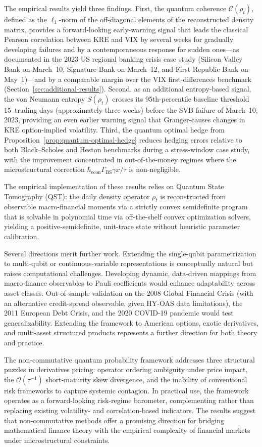 The empirical results yield three findings. First, the quantum coherence
$\mathcal{C}(\rho_t)$, defined as the $\ell_1$-norm of the off-diagonal
elements of the reconstructed density matrix, provides a forward-looking
early-warning signal that leads the classical Pearson correlation between
KRE and VIX by several weeks for gradually developing failures and by a
contemporaneous response for sudden ones---as documented in the 2023 US
regional banking crisis case study (Silicon Valley Bank on March~10,
Signature Bank on March~12, and First Republic Bank on May~1)---and by a
comparable margin over the VIX first-differences benchmark
(Section~\ref{sec:additional-results}). Second, as an additional
entropy-based signal, the von Neumann entropy
$S(\rho_t)$ crosses its 95th-percentile baseline threshold 15~trading days
(approximately three weeks) before the SVB failure of March~10, 2023,
providing an even earlier warning signal that Granger-causes changes in
KRE option-implied volatility. Third, the quantum optimal hedge from
Proposition~\ref{prop:quantum-optimal-hedge} reduces hedging errors relative
to both Black--Scholes and Heston benchmarks during a stress-window case study, with the
improvement concentrated in out-of-the-money regimes where the microstructural
correction $\hbar_{\mathrm{econ}} \Gamma_{\text{BS}} \gamma x / \tau$ is
non-negligible.

The empirical implementation of these results relies on Quantum State
Tomography (QST): the daily density operator $\rho_t$ is reconstructed
from observable macro-financial moments via a strictly convex semidefinite
program that is solvable in polynomial time via off-the-shelf convex
optimization solvers, yielding a positive-semidefinite, unit-trace state
without heuristic parameter calibration.

Several directions merit further work. Extending the single-qubit
parametrization to multi-qubit or continuous-variable representations is
conceptually natural but raises computational challenges. Developing dynamic,
data-driven mappings from macro-finance observables to Pauli coefficients
would enhance adaptability across asset classes. Out-of-sample validation on
the 2008 Global Financial Crisis (with an alternative credit-spread
observable, given HY-OAS data limitations), the 2011 European Debt Crisis,
and the 2020 COVID-19 pandemic would test generalizability. Extending the
framework to American options, exotic derivatives, and multi-asset structured
products represents a further direction for both theory and practice.

The non-commutative quantum probability framework addresses three structural
puzzles in derivatives pricing: operator ordering ambiguity under price
impact, the $\mathcal{O}(\tau^{-1})$ short-maturity skew divergence, and the
inability of conventional risk frameworks to capture systemic contagion. In
practical use, the framework operates as a forward-looking risk-regime
barometer, complementing rather than replacing existing volatility- and
correlation-based indicators. The results suggest that non-commutative methods
offer a promising direction for bridging mathematical finance theory with the
empirical complexity of financial markets under microstructural constraints.
